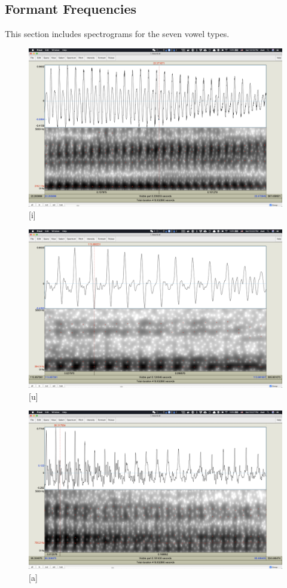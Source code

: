 \documentclass[a4paper]{article}
\begin{document}
\subsection{Formant Frequencies}
This section includes spectrograms for the seven vowel types.
\begin{figure}[H]
    \centering
    \includegraphics[scale=0.25]{imgs/vowel_i.png}
    \caption{[i]}
\end{figure}
\begin{figure}[H]
    \centering
    \includegraphics[scale=0.25]{imgs/vowel_u.png}
    \caption{[u]}
\end{figure}
\begin{figure}[H]
    \centering
    \includegraphics[scale=0.25]{imgs/vowel_a.png}
    \caption{[a]}
\end{figure}
\end{document}
